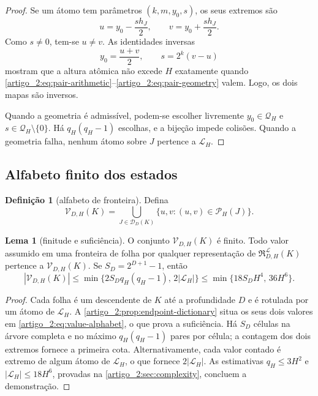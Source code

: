\documentclass[12pt,a4paper]{article}
\theoremstyle{preciso}
\theoremstyle{definition}
\newcommand{\Library}{\mathcal{L}}
\newcommand{\Representations}{\mathfrak{R}}
\newcommand{\Values}{\mathcal{V}}
\newcommand{\Pairs}{\mathcal{P}}
\theoremstyle{preciso}
\theoremstyle{preciso}
\newtheorem{lemma}[teorema]{Lema}
\theoremstyle{preciso}
\theoremstyle{preciso}
\theoremstyle{definition}
\newtheorem{definition}[teorema]{Definição}
\theoremstyle{preciso}
\theoremstyle{definition}
\theoremstyle{preciso}
\theoremstyle{preciso}
\theoremstyle{definition}
\begin{document}
\begin{proof}
Se um átomo tem parâmetros $(k,m,y_0,s)$, os seus extremos são
\[
 u=y_0-\frac{s h_J}{2},\qquad
 v=y_0+\frac{s h_J}{2}.
\]
Como $s\ne0$, tem-se $u\ne v$. As identidades inversas
\[
 y_0=\frac{u+v}{2},\qquad s=2^k(v-u)
\]
mostram que a altura atômica não excede $H$ exatamente quando
\eqref{artigo_2:eq:pair-arithmetic}--\eqref{artigo_2:eq:pair-geometry} valem. Logo, os dois
mapas são inversos.

Quando a geometria é admissível, podem-se escolher livremente
$y_0\in\mathcal Q_H$ e $s\in\mathcal Q_H\setminus\{0\}$. Há
$q_H(q_H-1)$ escolhas, e a bijeção impede colisões. Quando a geometria falha,
nenhum átomo sobre $J$ pertence a $\Library_H$.
\end{proof}

\subsection{Alfabeto finito dos estados}

\begin{definition}[alfabeto de fronteira]\label{map:artigo_2:4.3}
\label{artigo_2:def:value-alphabet}
Defina
\begin{equation}
 \Values_{D,H}(K)
 =\bigcup_{J\in\mathcal D_D(K)}
 \{u,v:(u,v)\in\Pairs_H(J)\}.
 \label{artigo_2:eq:value-alphabet}
\end{equation}
\end{definition}

\begin{lemma}[finitude e suficiência]\label{map:artigo_2:4.4}
\label{artigo_2:lem:value-alphabet}
O conjunto $\Values_{D,H}(K)$ é finito. Todo valor assumido em uma fronteira
de folha por qualquer representação de
$\Representations_{D,H}^{\Library}(K)$ pertence a
$\Values_{D,H}(K)$. Se $S_D=2^{D+1}-1$, então
\begin{equation}
 |\Values_{D,H}(K)|
 \le \min\{2S_Dq_H(q_H-1),\,2|\Library_H|\}
 \le \min\{18S_DH^4,\,36H^6\}.
 \label{artigo_2:eq:value-alphabet-bound}
\end{equation}
\end{lemma}

\begin{proof}
Cada folha é um descendente de $K$ até a profundidade $D$ e é rotulada por um
átomo de $\Library_H$. A \cref{artigo_2:prop:endpoint-dictionary} situa os seus dois
valores em \eqref{artigo_2:eq:value-alphabet}, o que prova a suficiência. Há $S_D$ células
na árvore completa e no máximo $q_H(q_H-1)$ pares por célula; a contagem dos dois
extremos fornece a primeira cota. Alternativamente, cada valor contado é extremo
de algum átomo de $\Library_H$, o que fornece $2|\Library_H|$. As estimativas
$q_H\le3H^2$ e $|\Library_H|\le18H^6$, provadas na \cref{artigo_2:sec:complexity},
concluem a demonstração.
\end{proof}
\end{document}
